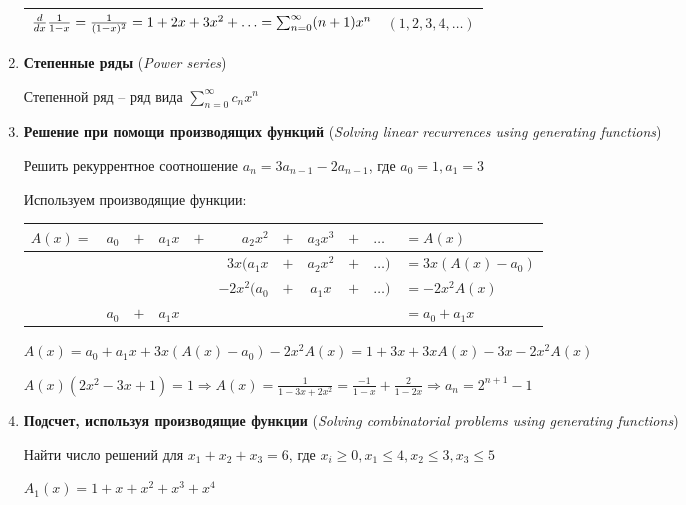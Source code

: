 \documentclass[12pt]{article}
\begin{document}
\begin{enumerate}
{\begin{tabular}{p{}|p{}}
            $\frac{d}{dx}\frac{1}{1 - x} = \frac{1}{(1 - x)^2} = 1 + 2x + 3x^2 + \dots \hfill = \sum_{n = 0}^{\infty} (n + 1) x^n$ & $(1, 2, 3, 4, \dots)$ \\\hline

        \end{tabular}
        }

        \item \textbf{Степенные ряды} (\textit{Power series})

        Степенной ряд -- ряд вида $\sum_{n = 0}^\infty c_n x^n$

        \item \textbf{Решение при помощи производящих функций} (\textit{Solving linear recurrences using generating functions})

        Решить рекуррентное соотношение $a_n = 3a_{n-1} - 2a_{n-1}$, где $a_0 = 1, a_1 = 3$

        Используем производящие функции:

        \setlength{\tabcolsep}{2pt}
        \begin{tabular}{cccrcrcccll}
            $A(x) = $ & $a_0$ & $+$ & $a_1 x$ & $+$ & $a_2 x^2$    & $+$ & $a_3 x^3$ & $+$ & $\dots$  &  $ = A(x)$                  \\ \hline
             &       &     &         &     & $3x(a_1 x$   & $+$ & $a_2 x^2$ & $+$ & $\dots)$ & $= 3x(A(x) - a_0)$ \\
                   &       &     &         &     & $-2x^2(a_0 $ & $+$ & $a_1 x$   & $+$ & $\dots)$ & $= -2x^2 A(x)$     \\
                   & $a_0$ & $+$ & $a_1 x$ &     &              &     &           &     &          & $= a_0 + a_1 x$
        \end{tabular}

        $A(x) = a_0 + a_1 x + 3x(A(x) - a_0) - 2x^2 A(x) = 1 + 3x + 3xA(x) - 3x - 2x^2 A(x)$

        $A(x) (2x^2 - 3x + 1) = 1 \Longrightarrow A(x) = \frac{1}{1 - 3x + 2x^2} = \frac{-1}{1 - x} + \frac{2}{1 - 2x} \Longrightarrow a_n = 2^{n + 1} - 1$

        \item \textbf{Подсчет, используя производящие функции} (\textit{Solving combinatorial problems using generating functions})
        
        Найти число решений для $x_1 + x_2 + x_3 = 6$, где $x_i \geq 0, x_1 \leq 4, x_2 \leq 3, x_3 \leq 5$

        $A_1(x) = 1 + x + x^2 + x^3 + x^4$


\end{enumerate}
\end{document}
